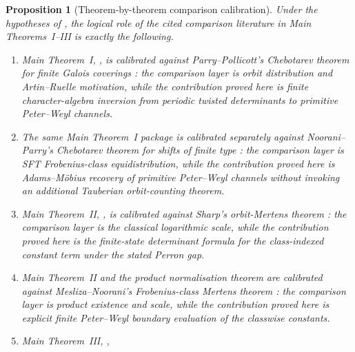 \documentclass[11pt,a4paper]{amsart}
\theoremstyle{plain}
\newtheorem{proposition}[theorem]{Proposition}
\theoremstyle{definition}
\theoremstyle{remark}
\begin{document}
\begin{proposition}[Theorem-by-theorem comparison calibration]
  \label{prop:theorem-by-theorem-comparison-calibration}
  Under the hypotheses of , the logical role of
  the cited comparison literature in Main Theorems~I--III is exactly the
  following.
  \begin{enumerate}[label=\textup{(\alph*)},leftmargin=*]
    \item Main Theorem~I,
    ,
    is calibrated against Parry--Pollicott's Chebotarev theorem for finite
    Galois coverings \cite{ParryPollicott1986Chebotarev}: the comparison layer
    is orbit distribution and Artin--Ruelle motivation, while the contribution
    proved here is finite character-algebra inversion from periodic twisted
    determinants to primitive Peter--Weyl channels.
    \item The same Main Theorem~I package is calibrated separately against
    Noorani--Parry's Chebotarev theorem for shifts of finite type
    \cite{NooraniParry1992ChebotarevShifts}: the comparison layer is SFT
    Frobenius-class equidistribution, while the contribution proved here is
    Adams--M\"obius recovery of primitive Peter--Weyl channels without invoking
    an additional Tauberian orbit-counting theorem.
    \item Main Theorem~II,
    ,
    is calibrated against Sharp's orbit-Mertens theorem
    \cite{Sharp1991Mertens}: the comparison layer is the classical logarithmic
    scale, while the contribution proved here is the finite-state determinant
    formula for the class-indexed constant term under the stated Perron gap.
    \item Main Theorem~II and the product normalisation theorem
     are
    calibrated against Mesliza--Noorani's Frobenius-class Mertens theorem
    \cite{MeslizaNoorani1999FrobeniusMertens}: the comparison layer is product
    existence and scale, while the contribution proved here is explicit finite
    Peter--Weyl boundary evaluation of the classwise constants.
    \item Main Theorem~III,
    ,

\end{enumerate}
\end{proposition}
\end{document}
